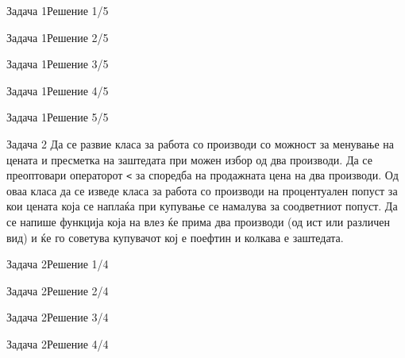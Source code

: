 \begin{frame}[fragile]{Задача 1}{Решение 1/5}

\end{frame}

\begin{frame}[fragile]{Задача 1}{Решение 2/5}

\end{frame}

\begin{frame}[fragile]{Задача 1}{Решение 3/5}

\end{frame}

\begin{frame}[fragile,shrink=10]{Задача 1}{Решение 4/5}

\end{frame}

\begin{frame}[fragile]{Задача 1}{Решение 5/5}

\end{frame}

\begin{frame}{Задача 2}{}
 Да се развие класа за работа со производи со можност за менување на цената и
 пресметка на заштедата при можен избор од два производи. Да се преоптовари
 операторот \texttt{<} за споредба на  продажната цена на два производи. Од оваа класа да
 се изведе класа за работа со производи на процентуален попуст за кои цената
 која се наплаќа при купување се намалува за соодветниот попуст. Да се напише
 функција која на влез ќе прима два производи (од ист или различен вид) и ќе го
 советува купувачот кој е поефтин и колкава е заштедата.
\end{frame}

\begin{frame}[fragile]{Задача 2}{Решение 1/4}

\end{frame}

\begin{frame}[fragile]{Задача 2}{Решение 2/4}

\end{frame}

\begin{frame}[fragile]{Задача 2}{Решение 3/4}

\end{frame}

\begin{frame}[fragile]{Задача 2}{Решение 4/4}

\end{frame}

